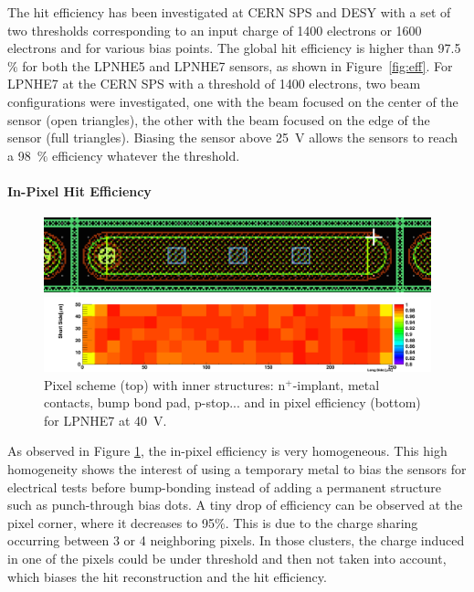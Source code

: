 The hit efficiency has been investigated at CERN SPS and DESY with a set of two thresholds corresponding to an input charge of 1400 electrons or 1600 electrons and for various bias points.
The global hit efficiency is higher than 97.5 $\%$ for both the LPNHE5 and LPNHE7 sensors, as shown in Figure~\ref{fig:eff}.
For LPNHE7 at the CERN SPS with a threshold of 1400 electrons, two beam configurations were investigated, one with the beam focused on the center of the sensor (open triangles), the other with the beam focused on the edge of the sensor (full triangles).
Biasing the sensor above 25~V allows the sensors to reach a 98~$\%$ efficiency whatever the threshold.

\paragraph{In-Pixel Hit Efficiency}


\begin{figure}[htbp]
\centering %
\includegraphics[width=.7\textwidth,origin=c,angle=0]{rsz_schemepix.png}

\includegraphics[width=.75\textwidth,origin=c,angle=0]{pixeff-center.png}
\caption{\label{fig:pix} Pixel scheme (top) with inner structures: n$^+$-implant, metal contacts, bump bond pad, p-stop... and in pixel efficiency (bottom) for LPNHE7 at 40~V.}


\end{figure}
As observed in Figure \ref{fig:pix}, the in-pixel efficiency is very homogeneous. This high homogeneity shows the interest of using a temporary metal to bias the sensors for electrical tests before bump-bonding instead of adding a permanent structure such as punch-through bias dots. A tiny drop of efficiency can be observed at the pixel corner, where it decreases to  95$\%$. This is due to the charge sharing occurring between 3 or 4 neighboring pixels. In those clusters, the charge induced in one of the pixels could be under threshold and then not taken into account, which biases the hit reconstruction and the hit efficiency.

